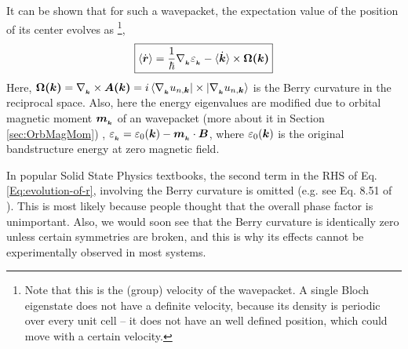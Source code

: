 \documentclass{report}
\renewcommand\vec[1]{\ensuremath\boldsymbol{#1}} %
\begin{document}
It can be shown \cite{ralph2020berry} that for such a wavepacket, the expectation value of the position of its center evolves as \footnote{Note that this is the (group) velocity of the wavepacket. A single Bloch eigenstate does not have a definite velocity, because its density is periodic over every unit cell -- it does not have an well defined position, which could move with a certain velocity.},
\begin{equation}\label{Eq:evolution-of-r}
	\boxed{\langle\dot{\vec{r}}\rangle = \frac{1}{\hbar} \nabla{_{_{\vec{k}}}} \varepsilon_{_{\vec{k}}} - \langle\dot{\vec{k}}\rangle \times \vec{\Omega(\vec{k})}}
\end{equation}
Here, $\vec{\Omega(\vec{k})} = \nabla_{_{\vec{k}}} \times \vec{A(\vec{k})} = i \bra{\nabla_{_{\vec{k}}} u_{n,\vec{k}}}\times \ket{\nabla_{_{\vec{k}}} u_{n,\vec{k}}}$ is the Berry curvature in the reciprocal space. Also, here the energy eigenvalues are modified due to orbital magnetic moment $\vec{m}_{_{\vec{k}}}$ of an wavepacket (more about it in Section \ref{sec:OrbMagMom}) , $\varepsilon_{_{\vec{k}}} = \varepsilon_0(\vec{k}) - \vec{m}_{_{\vec{k}}} \cdot \vec{B}$, where $\varepsilon_0(\vec{k})$ is the original bandstructure energy at zero magnetic field.

In popular Solid State Physics textbooks, the second term in the RHS of Eq. \eqref{Eq:evolution-of-r}, involving the Berry curvature is omitted (e.g. see Eq. 8.51 of \cite{book:AshcroftMermin76}). This is most likely because people thought that the overall phase factor is unimportant. Also, we would soon see that the Berry curvature is identically zero unless certain symmetries are broken, and this is why its effects cannot be experimentally observed in most systems. 
\end{document}
